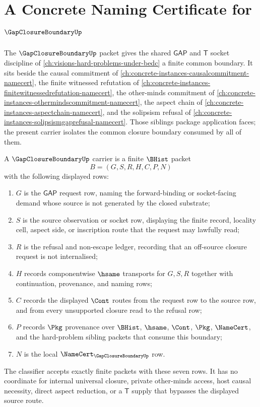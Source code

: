 \chapter{A Concrete Naming Certificate for $\GapClosureBoundaryUp$}
\label{ch:concrete-instances-gapclosureboundary-namecert}

The $\GapClosureBoundaryUp$ packet gives the shared $\mathsf{GAP}$ and $\mathsf{T}$ socket discipline of \autoref{ch:visions-hard-problems-under-bedc} a finite common boundary. It sits beside the causal commitment of \autoref{ch:concrete-instances-causalcommitment-namecert}, the finite witnessed refutation of \autoref{ch:concrete-instances-finitewitnessedrefutation-namecert}, the other-minds commitment of \autoref{ch:concrete-instances-othermindscommitment-namecert}, the aspect chain of \autoref{ch:concrete-instances-aspectchain-namecert}, and the solipsism refusal of \autoref{ch:concrete-instances-solipsismgaprefusal-namecert}. Those siblings package application faces; the present carrier isolates the common closure boundary consumed by all of them.

\begin{definition}
\label{def:gap-closure-boundary-carrier}
A $\GapClosureBoundaryUp$ carrier is a finite $\BHist$ packet
$$
B=(G,S,R,H,C,P,N)
$$
with the following displayed rows:
\begin{enumerate}
\item $G$ is the $\mathsf{GAP}$ request row, naming the forward-binding or socket-facing demand whose source is not generated by the closed substrate;
\item $S$ is the source observation or socket row, displaying the finite record, locality cell, aspect side, or inscription route that the request may lawfully read;
\item $R$ is the refusal and non-escape ledger, recording that an off-source closure request is not internalised;
\item $H$ records componentwise $\hsame$ transports for $G,S,R$ together with continuation, provenance, and naming rows;
\item $C$ records the displayed $\Cont$ routes from the request row to the source row, and from every unsupported closure read to the refusal row;
\item $P$ records $\Pkg$ provenance over $\BHist$, $\hsame$, $\Cont$, $\Pkg$, $\NameCert$, and the hard-problem sibling packets that consume this boundary;
\item $N$ is the local $\NameCert_{\GapClosureBoundaryUp}$ row.
\end{enumerate}
The classifier accepts exactly finite packets with these seven rows. It has no coordinate for internal universal closure, private other-minds access, host causal necessity, direct aspect reduction, or a $\mathsf{T}$ supply that bypasses the displayed source route.
\end{definition}

